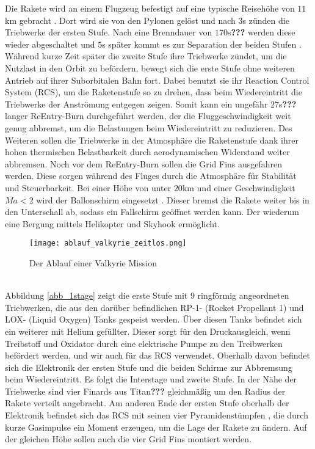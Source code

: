 Die Rakete wird an einem Flugzeug befestigt auf eine typische Reisehöhe von $11$km gebracht \cite{flugbahnBarz}. Dort wird sie von den Pylonen gelöst und nach $3$s zünden die Triebwerke der ersten Stufe. Nach eine Brenndauer von $170$s\textbf{???} werden diese wieder abgeschaltet und $5$s später kommt es zur Separation der beiden Stufen \cite{flugbahnBarz}. Während kurze Zeit später die zweite Stufe ihre Triebwerke zündet, um die Nutzlast in den Orbit zu befördern, bewegt sich die erste Stufe ohne weiteren Antrieb auf ihrer Suborbitalen Bahn fort. Dabei benutzt sie ihr Reaction Control System (RCS), um die Raketenstufe so zu drehen, dass beim Wiedereintritt die Triebwerke der Anströmung entgegen zeigen. Somit kann ein ungefähr $27$s\textbf{???} langer ReEntry-Burn durchgeführt werden, der die Fluggeschwindigkeit weit genug abbremst, um die Belastungen beim Wiedereintritt zu reduzieren. Des Weiteren sollen die Triebwerke in der Atmosphäre die Raketenstufe dank ihrer hohen thermischen Belastbarkeit durch aerodynamischen Widerstand weiter abbremsen. Noch vor dem ReEntry-Burn sollen die Grid Fins ausgefahren werden. Diese sorgen während des Fluges durch die Atmosphäre für Stabilität und Steuerbarkeit. Bei einer Höhe von unter $20$km und einer Geschwindigkeit $Ma<2$ wird der Ballonschirm eingesetzt \cite{flugbahnBarz}. Dieser bremst die Rakete weiter bis in den Unterschall ab, sodass ein Fallschirm geöffnet werden kann. Der wiederum eine Bergung mittels Helikopter und Skyhook ermöglicht.
\begin{figure}[h]
	\centering
	\texttt{[image: ablauf\_valkyrie\_zeitlos.png]}
	\begin{flushright}
	\end{flushright}
	\caption{Der Ablauf einer Valkyrie Mission}
	\label{abb_valkMission}
\end{figure}\\
Abbildung \ref{abb_1stage} zeigt die erste Stufe mit $9$ ringförmig angeordneten Triebwerken, die aus den darüber befindlichen RP-1- (Rocket Propellant 1) und LOX- (Liquid Oxygen) Tanks gespeist werden. Über diesen Tanks befindet sich ein weiterer mit Helium gefüllter. Dieser sorgt für den Druckausgleich, wenn Treibstoff und Oxidator durch eine elektrische Pumpe zu den Treibwerken befördert werden, und wir auch für das RCS verwendet. Oberhalb davon befindet sich die Elektronik der ersten Stufe und die beiden Schirme zur Abbremsung beim Wiedereintritt. Es folgt die Interstage und zweite Stufe.
In der Nähe der Triebwerke sind vier Finards aus Titan\textbf{???} gleichmäßig um den Radius der Rakete verteilt angebracht. Am anderen Ende der ersten Stufe oberhalb der Elektronik befindet sich das RCS mit seinen vier Pyramidenstümpfen \cite{flugbahnBarz}, die durch kurze Gasimpulse ein Moment erzeugen, um die Lage der Rakete zu ändern. Auf der gleichen Höhe sollen auch die vier Grid Fins montiert werden.

